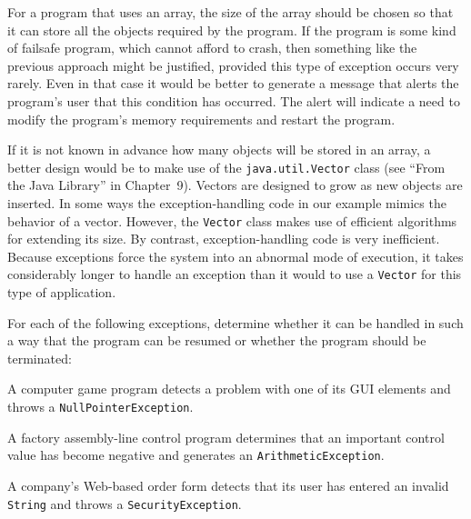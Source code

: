 \noindent For a program that uses an array, the size of the array should
be chosen so that it can store all the objects required by the
program.  If the program is some kind of failsafe program, which cannot afford
to crash, then something like the previous approach might be justified,
provided this type of exception occurs very rarely.  Even in that case
it would be better to generate a message that alerts the program's
user that this condition has occurred.   The alert will indicate a need
to modify the program's memory requirements and restart the program.


If it is not known in advance how many objects will be stored in an
array, a better design would be to make use of the
{\tt java.util.Vector} class (see ``From the Java Library'' in
Chapter~9). Vectors are
designed to grow as new objects are inserted.  In some
ways the exception-handling code in our example mimics the behavior of
a vector.   However, the {\tt Vector} class makes use of efficient
algorithms for extending its size.  By contrast, exception-handling
code is very inefficient.  Because exceptions force the system into an
abnormal mode of execution, it takes considerably longer to handle an
exception than it would to use a {\tt Vector} for this type of
application.  


\label{self-study-exercise}
\begin{SSTUDY}

\item  For each of the following exceptions, determine whether it can be
handled in such a way that the program can be resumed or whether the
program should be terminated:

\begin{EXRLL}
\item  A computer game program detects a problem with one of its GUI
elements and throws a {\tt NullPointerException}.

\item  A factory assembly-line control program determines that an
important control value has become negative and generates an
{\tt Arithmetic\-Exception}.

\item  A company's Web-based order form detects that its user has entered
an invalid {\tt String} and throws a {\tt SecurityException}.
\end{EXRLL}

\end{SSTUDY}

